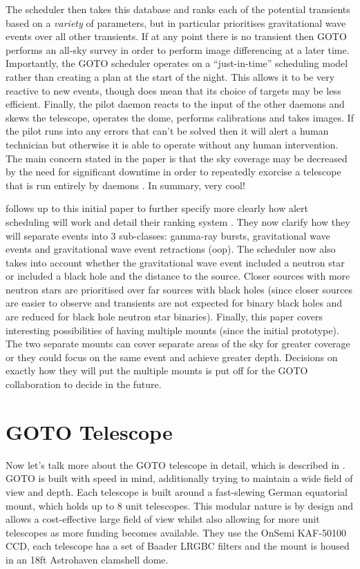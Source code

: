 \documentclass[twocolumn]{aastex631}
\begin{document}
The scheduler then takes this database and ranks each of the potential transients based on a \textit{variety} of parameters, but in particular prioritises gravitational wave events over all other transients. If at any point there is no transient then GOTO performs an all-sky survey in order to perform image differencing at a later time. Importantly, the GOTO scheduler operates on a ``just-in-time'' scheduling model rather than creating a plan at the start of the night. This allows it to be very reactive to new events, though does mean that its choice of targets may be less efficient. Finally, the pilot daemon reacts to the input of the other daemons and skews the telescope, operates the dome, performs calibrations and takes images. If the pilot runs into any errors that can't be solved then it will alert a human technician but otherwise it is able to operate without any human intervention. The main concern stated in the paper is that the sky coverage may be decreased by the need for significant downtime in order to repeatedly exorcise a telescope that is run entirely by daemons \citep{2004exorcismis}. In summary, very cool!

\citet{Dyer+2020} follows up to this initial paper to further specify more clearly how alert scheduling will work and detail their ranking system \citep[e.g.\ see Eq.~1][]{Dyer+2020}. They now clarify how they will separate events into 3 sub-classes: gamma-ray bursts, gravitational wave events and gravitational wave event retractions (oop). The scheduler now also takes into account whether the gravitational wave event included a neutron star or included a black hole and the distance to the source. Closer sources with more neutron stars are prioritised over far sources with black holes (since closer sources are easier to observe and transients are not expected for binary black holes and are reduced for black hole neutron star binaries). Finally, this paper covers interesting possibilities of having multiple mounts (since the initial prototype). The two separate mounts can cover separate areas of the sky for greater coverage or they could focus on the same event and achieve greater depth. Decisions on exactly how they will put the multiple mounts is put off for the GOTO collaboration to decide in the future.

\section{GOTO Telescope}
Now let's talk more about the GOTO telescope in detail, which is described in \citet{GOTO+2020}. GOTO is built with speed in mind, additionally trying to maintain a wide field of view and depth. Each telescope is built around a fast-slewing German equatorial mount, which holds up to 8 unit telescopes. This modular nature is by design and allows a cost-effective large field of view whilst also allowing for more unit telescopes as more funding becomes available. They use the OnSemi KAF-50100 CCD, each telescope has a set of Baader LRGBC filters and the mount is housed in an 18ft Astrohaven clamshell dome.
\end{document}
